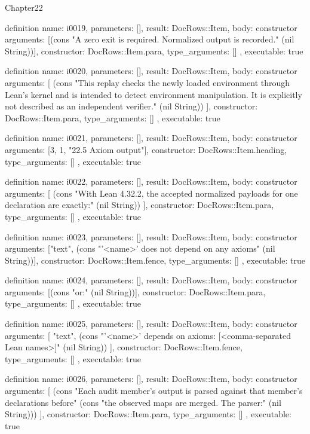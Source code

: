 \begin{lexlean}{Chapter22}
\begin{semanticmodule}
definition{
  name: i0019,
  parameters: [],
  result: DocRows::Item,
  body: constructor{
    arguments: [(cons "A zero exit is required. Normalized output is recorded." (nil String))],
    constructor: DocRows::Item.para,
    type_arguments: []
  },
  executable: true
}

definition{
  name: i0020,
  parameters: [],
  result: DocRows::Item,
  body: constructor{
    arguments: [
      (cons "This replay checks the newly loaded environment through Lean's kernel and is intended to detect environment manipulation. It is explicitly not described as an independent verifier." (nil String))
    ],
    constructor: DocRows::Item.para,
    type_arguments: []
  },
  executable: true
}

definition{
  name: i0021,
  parameters: [],
  result: DocRows::Item,
  body: constructor{
    arguments: [3, 1, "22.5 Axiom output"],
    constructor: DocRows::Item.heading,
    type_arguments: []
  },
  executable: true
}

definition{
  name: i0022,
  parameters: [],
  result: DocRows::Item,
  body: constructor{
    arguments: [
      (cons "With Lean 4.32.2, the accepted normalized payloads for one declaration are exactly:" (nil String))
    ],
    constructor: DocRows::Item.para,
    type_arguments: []
  },
  executable: true
}

definition{
  name: i0023,
  parameters: [],
  result: DocRows::Item,
  body: constructor{
    arguments: ["text", (cons "'<name>' does not depend on any axioms" (nil String))],
    constructor: DocRows::Item.fence,
    type_arguments: []
  },
  executable: true
}

definition{
  name: i0024,
  parameters: [],
  result: DocRows::Item,
  body: constructor{
    arguments: [(cons "or:" (nil String))],
    constructor: DocRows::Item.para,
    type_arguments: []
  },
  executable: true
}

definition{
  name: i0025,
  parameters: [],
  result: DocRows::Item,
  body: constructor{
    arguments: [
      "text",
      (cons "'<name>' depends on axioms: [<comma-separated Lean names>]" (nil String))
    ],
    constructor: DocRows::Item.fence,
    type_arguments: []
  },
  executable: true
}

definition{
  name: i0026,
  parameters: [],
  result: DocRows::Item,
  body: constructor{
    arguments: [
      (cons "Each audit member's output is parsed against that member's declarations before" (cons "the observed maps are merged. The parser:" (nil String)))
    ],
    constructor: DocRows::Item.para,
    type_arguments: []
  },
  executable: true
}


\end{semanticmodule}
\end{lexlean}
